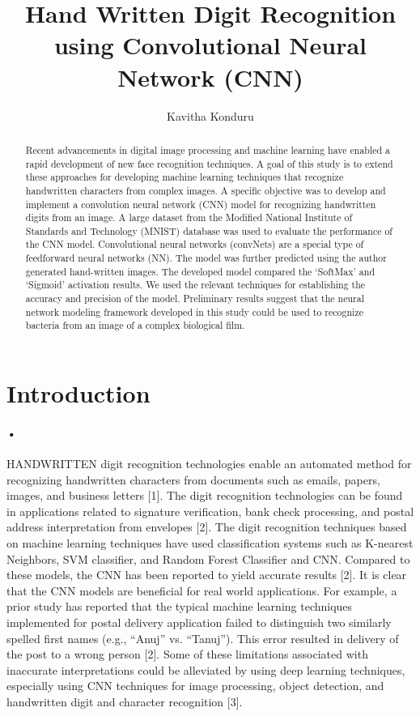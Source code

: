 \documentclass{article}
\title{Hand Written Digit Recognition using Convolutional Neural Network (CNN)}\author{Kavitha Konduru}
\begin{document}
\maketitle

\begin{abstract}
  Recent advancements in digital image processing and machine learning have enabled a rapid development of new face recognition techniques. A goal of this study is to extend these approaches for developing machine learning techniques that recognize handwritten characters from complex images. A specific objective was to develop and implement a convolution neural network (CNN) model for recognizing handwritten digits from an image. A large dataset from the Modified National Institute of Standards and Technology (MNIST) database was used to evaluate the performance of the CNN model. Convolutional neural networks (convNets) are a special type of feedforward neural networks (NN). The model was further predicted using the author generated hand-written images. The developed model compared the ‘SoftMax’ and ‘Sigmoid’ activation results. We used the relevant techniques for establishing the accuracy and precision of the model. Preliminary results suggest that the neural network modeling framework developed in this study could be used to recognize bacteria from an image of a complex biological film. 
\end{abstract}

\section{Introduction}

\paragraph{•}
HANDWRITTEN digit recognition technologies enable an automated method for recognizing handwritten characters from documents such as emails, papers, images, and business letters [1]. The digit recognition technologies can be found in applications related to signature verification, bank check processing, and postal address interpretation from envelopes [2]. The digit recognition techniques based on machine learning techniques have used classification systems such as K-nearest Neighbors, SVM classifier, and Random Forest Classifier and CNN. Compared to these models, the CNN has been reported to yield accurate results [2]. It is clear that the CNN models are beneficial for real world applications. For example, a prior study has reported that the typical machine learning techniques implemented for postal delivery application failed to distinguish two similarly spelled first names (e.g., “Anuj” vs. “Tanuj”). This error resulted in delivery of the post to a wrong person [2]. Some of these limitations associated with inaccurate interpretations could be alleviated by using deep learning techniques, especially using CNN techniques for image processing, object detection, and handwritten digit and character recognition [3]. 
\end{document}

